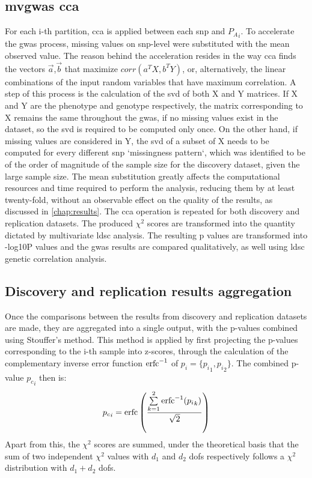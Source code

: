 \subsection{\acs{mvgwas} \acs{cca}}
For each i-th partition, \ac{cca} is applied between each \ac{snp} and ${P_A}_i$. To accelerate the \ac{gwas} process, missing values on snp-level were substituted with the mean observed value. The reason behind the acceleration resides in the way \ac{cca} finds the vectors $\vec{a}$,$\vec{b}$  that maximize $corr(a^TX,b^TY)$, or, alternatively, the linear combinations of the input random variables that have maximum correlation. A step of this process is the calculation of the \ac{svd} of both X and Y matrices. If X and Y are the phenotype and genotype respectively, the matrix corresponding to X remains the same throughout the \ac{gwas}, if no missing values exist in the dataset, so the \ac{svd} is required to be computed only once. On the other hand, if missing values are considered in Y, the \ac{svd} of a subset of X needs to be computed for every different \ac{snp} `missingness pattern`, which was identified to be of the order of magnitude of the sample size for the discovery dataset, given the large sample size. The mean substitution greatly affects the computational resources and time required to perform the analysis, reducing them by at least twenty-fold, without an observable effect on the quality of the results, as discussed in \autoref{chap:results}.
The \ac{cca} operation is repeated for both discovery and replication datasets. The produced $\chi^2$ scores are transformed into the quantity dictated by multivariate \ac{ldsc} analysis. The resulting p values are transformed into -log10P values and the \ac{gwas} results are compared qualitatively, as well using \ac{ldsc} genetic correlation analysis.

\subsection{Discovery and replication results aggregation}
Once the comparisons between the results from discovery and replication datasets are made, they are aggregated into a single output, with the p-values combined using Stouffer's method. This method is applied by first projecting the p-values corresponding to the i-th sample into z-scores, through the calculation of the complementary inverse error function $\operatorname*{erfc}^{-1}$ of $p_i=\{{p_i}_1,{p_i}_2\}$. The combined p-value ${p_c}_i$ then is:
$$
 {p_c}_i= \operatorname*{erfc}\left(\frac{\sum\limits_{k=1}^2 \operatorname*{erfc}^{-1}({p_i}_k)}{\sqrt{2}}\right)
$$
Apart from this, the $\chi^2$ scores are summed, under the theoretical basis that the sum of two independent $\chi^2$ values with $d_1$ and $d_2$ \acp{dof} respectively follows a $\chi^2$ distribution with $d_1+d_2$ \acp{dof}.

